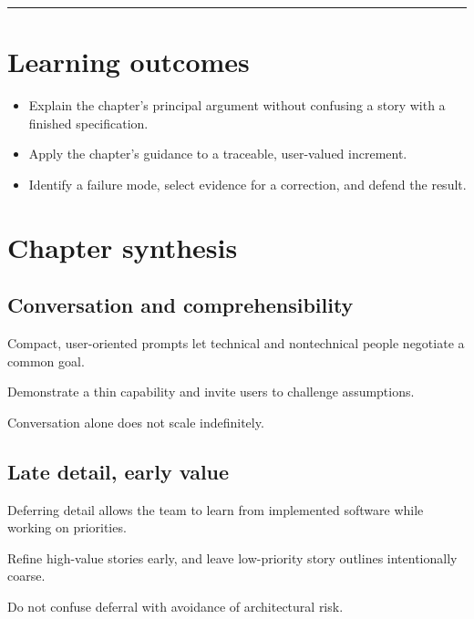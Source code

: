 \documentclass[11pt,letterpaper]{article}
\begin{document}
\tableofcontents\medskip\noindent\rule{\linewidth}{0.4pt}\medskip
\section{Learning outcomes}
\begin{itemize}[leftmargin=*,itemsep=2pt]
\item Explain the chapter's principal argument without confusing a story with a finished specification.
\item Apply the chapter's guidance to a traceable, user-valued increment.
\item Identify a failure mode, select evidence for a correction, and defend the result.
\end{itemize}
\section{Chapter synthesis}
\subsection{Conversation and comprehensibility}
Compact, user-oriented prompts let technical and nontechnical people negotiate a common goal.

\begin{tcolorbox}[colback=tealback,colframe=navy,title={Engineering translation},breakable]
Demonstrate a thin capability and invite users to challenge assumptions.

\end{tcolorbox}
\begin{tcolorbox}[colback=amberback,colframe=navy,title={Failure mode to watch},breakable]
Conversation alone does not scale indefinitely.

\end{tcolorbox}
\subsection{Late detail, early value}
Deferring detail allows the team to learn from implemented software while working on priorities.

\begin{tcolorbox}[colback=tealback,colframe=navy,title={Engineering translation},breakable]
Refine high-value stories early, and leave low-priority story outlines intentionally coarse.

\end{tcolorbox}
\begin{tcolorbox}[colback=amberback,colframe=navy,title={Failure mode to watch},breakable]
Do not confuse deferral with avoidance of architectural risk.

\end{tcolorbox}
\end{document}
